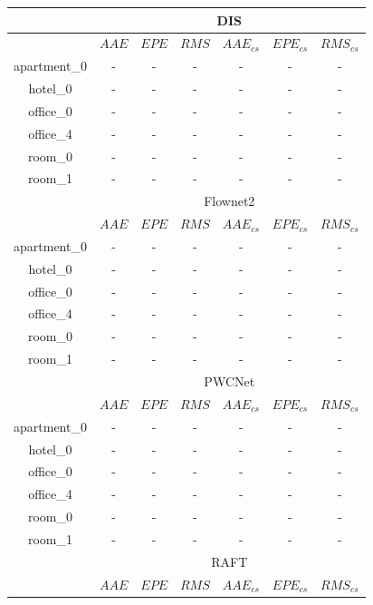 \begin{table}[h!]
	\centering
	\begin{tabular}{ c | c | c | c | c | c | c }
		\hline
		& \multicolumn{6}{c}{DIS}  \\
		\hline
		& ${AAE}$ & ${EPE}$ & ${RMS}$ & ${AAE_{cs}}$ & ${EPE_{cs}}$ & ${RMS_{cs}}$ \\
		\hline
		apartment\_0 & - & - & -  & - & - & -  \\ 
		\hline
		hotel\_0 & - & - & -  & - & - & -  \\ 
		\hline
		office\_0 & - & - & - & - & - & -  \\ 
		\hline
		office\_4 & - & - & -  & - & - & -  \\ 
		\hline
		room\_0 & - & - & - & - & - & -  \\ 
		\hline
		room\_1 & - & - & -  & - & - & -  \\ 
		\hline\hline
		& \multicolumn{6}{c}{Flownet2} \\
		\hline
		& ${AAE}$ & ${EPE}$ & ${RMS}$ & ${AAE_{cs}}$ & ${EPE_{cs}}$ & ${RMS_{cs}}$ \\
		\hline
		apartment\_0 & - & - & -  & - & - & -  \\ 
		\hline
		hotel\_0 & - & - & -  & - & - & -  \\ 
		\hline
		office\_0 & - & - & - & - & - & -  \\ 
		\hline
		office\_4 & - & - & -  & - & - & -  \\ 
		\hline
		room\_0 & - & - & - & - & - & -  \\ 
		\hline
		room\_1 & - & - & -  & - & - & -  \\ 
		\hline\hline
		& \multicolumn{6}{c}{PWCNet} \\
		\hline
		& ${AAE}$ & ${EPE}$ & ${RMS}$ & ${AAE_{cs}}$ & ${EPE_{cs}}$ & ${RMS_{cs}}$ \\
		\hline
		apartment\_0 & - & - & -  & - & - & -  \\ 
		\hline
		hotel\_0 & - & - & -  & - & - & -  \\ 
		\hline
		office\_0 & - & - & - & - & - & -  \\ 
		\hline
		office\_4 & - & - & -  & - & - & -  \\ 
		\hline
		room\_0 & - & - & - & - & - & -  \\ 
		\hline
		room\_1 & - & - & -  & - & - & -  \\ 
		\hline\hline
		& \multicolumn{6}{c}{RAFT} \\
		\hline
		& ${AAE}$ & ${EPE}$ & ${RMS}$ & ${AAE_{cs}}$ & ${EPE_{cs}}$ & ${RMS_{cs}}$ \\

\end{tabular}
\end{table}
